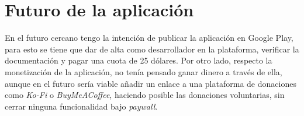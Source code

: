 \section{Futuro de la aplicación}
En el futuro cercano tengo la intención de publicar la aplicación en Google Play, para esto se tiene que dar de alta como desarrollador en la plataforma, verificar la documentación y pagar una cuota de 25 dólares. Por otro lado, respecto la monetización de la aplicación, no tenía pensado ganar dinero a través de ella, aunque en el futuro sería viable añadir un enlace a una plataforma de donaciones como \textit{Ko-Fi} o \textit{BuyMeACoffee}, haciendo posible las donaciones voluntarias, sin cerrar ninguna funcionalidad bajo \textit{paywall}.
%
%
